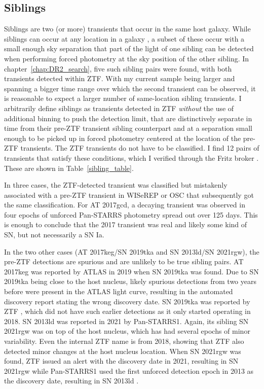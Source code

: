 \documentclass[a4paper,oneside,12pt, class=Latex/Classes/PhDthesisPSnPDF, crop=false]{standalone}
\begin{document}
\subsection{Siblings}
\label{siblings}
Siblings are two (or more) transients that occur in the same host galaxy. While siblings can occur at any location in a galaxy \citep[see e.g.][for a sample of ZTF-detected siblings]{BTS_siblings, DR2_siblings}, a subset of these occur with a small enough sky separation that part of the light of one sibling can be detected when performing forced photometry at the sky position of the other sibling. In chapter~\ref{chap:DR2_search}, five such sibling pairs were found, with both transients detected within ZTF. With my current sample being larger and spanning a bigger time range over which the second transient can be observed, it is reasonable to expect a larger number of same-location sibling transients. I arbitrarily define siblings as transients detected in ZTF \textit{without} the use of additional binning to push the detection limit, that are distinctively separate in time from their pre-ZTF transient sibling counterpart and at a separation small enough to be picked up in forced photometry centered at the location of the pre-ZTF transients. The ZTF transients do not have to be classified. I find 12 pairs of transients that satisfy these conditions, which I verified through the Fritz broker \cite{skyportal2019, Skyportal}. These are shown in Table~\ref{sibling_table}. 

In three cases, the ZTF-detected transient was classified but mistakenly associated with a pre-ZTF transient in WISeREP or OSC that subsequently got the same classification. For AT 2017gcd, a decaying transient was observed in four epochs of unforced Pan-STARRS photometry spread out over 125 days. This is enough to conclude that the 2017 transient was real and likely some kind of SN, but not necessarily a SN Ia.

In the two other cases (AT 2017keg/SN 2019tka and SN 2013ld/SN 2021rgw), the pre-ZTF detections are spurious and are unlikely to be true sibling pairs. AT 2017keg was reported by ATLAS in 2019 \citep{2017keg_disc} when SN 2019tka was found. Due to SN 2019tka being close to the host nucleus, likely spurious detections from two years before were present in the ATLAS light curve, resulting in the automated discovery report stating the wrong discovery date. SN 2019tka was reported by ZTF \citep{2019tka_disc}, which did not have such earlier detections as it only started operating in 2018. SN 2013ld was reported in 2021 by Pan-STARRS1. Again, its sibling SN 2021rgw was on top of the host nucleus, which has had several epochs of minor variability. Even the internal ZTF name is from 2018, showing that ZTF also detected minor changes at the host nucleus location. When SN 2021rgw was found, ZTF issued an alert with the discovery date in 2021, resulting in SN 2021rgw \citep{2021rgw_disc} while Pan-STARRS1 used the first unforced detection epoch in 2013 as the discovery date, resulting in SN 2013ld \citep{2013ld_disc}.
\end{document}
